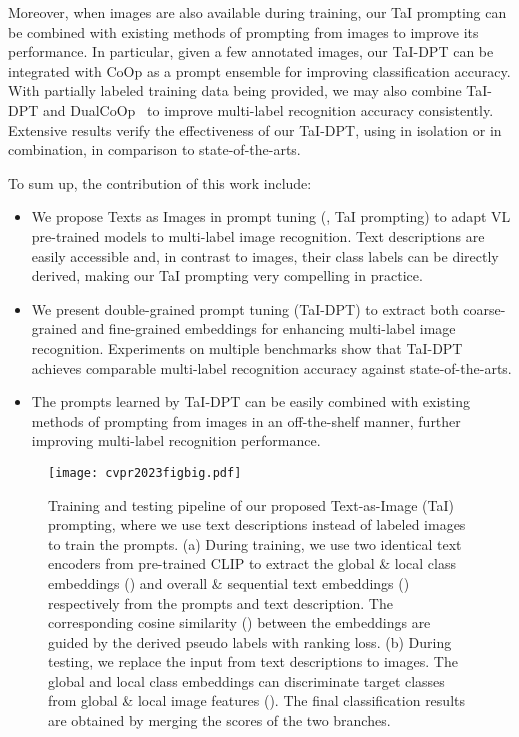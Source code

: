 \documentclass[10pt,twocolumn,letterpaper]{article}
\begin{document}
Moreover, when images are also available during training, our TaI prompting can be combined with existing methods of prompting from images to improve its performance. 
In particular, given a few annotated images, our TaI-DPT can be integrated with CoOp as a prompt ensemble for improving classification accuracy.
With partially labeled training data being provided, we may also combine TaI-DPT and DualCoOp~\cite{dualcoop} to improve multi-label recognition accuracy consistently.
Extensive results verify the effectiveness of our TaI-DPT, using in isolation or in combination, in comparison to state-of-the-arts.


To sum up, the contribution of this work include:
\begin{itemize}
\setlength{\itemsep}{0pt}
\setlength{\parsep}{0pt}
\setlength{\parskip}{0pt}
\item We propose Texts as Images in prompt tuning (\ie, TaI prompting) to adapt VL pre-trained models to multi-label image recognition.
Text descriptions are easily accessible and, in contrast to images, their class labels can be directly derived, making our TaI prompting very compelling in practice.
\item We present double-grained prompt tuning (\ie TaI-DPT) to extract both coarse-grained and fine-grained embeddings
for enhancing multi-label image recognition. Experiments on multiple benchmarks show that TaI-DPT achieves comparable multi-label recognition accuracy against state-of-the-arts.
\item  The prompts learned by TaI-DPT can be easily combined with existing methods of prompting from images in an off-the-shelf manner, further improving multi-label recognition performance.
\end{itemize}


\begin{figure*}
  \centering
\texttt{[image: cvpr2023figbig.pdf]}
  \vspace{-7.5mm}
  \caption{Training and testing pipeline of our proposed Text-as-Image (TaI) prompting, where we use text descriptions instead of labeled images to train the prompts. (a) During training, we use two identical text encoders from pre-trained CLIP to extract the global \& local class embeddings () and overall \& sequential text embeddings () respectively from the prompts and text description. The corresponding cosine similarity () between the embeddings are guided by the derived pseudo labels with ranking loss. (b) During testing, we replace the input from text descriptions to images. The global and local class embeddings can discriminate target classes from global \& local image features (). The final classification results are obtained by merging the scores of the two branches.}
  \label{fig:pipeline} \vskip -0.1in
\end{figure*}
\end{document}
